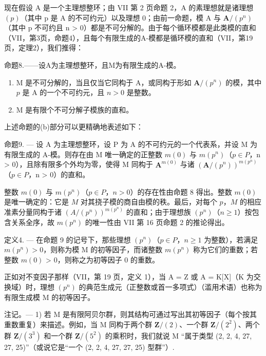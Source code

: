 现在假设 A 是一个主理想整环；由 VII 第 2 页命题 2，A 的素理想就是诸理想 \((p)\)（其中 p 是 A 的不可约元）以及理想 0；由前一命题，模 A 与 \(\mathbf{A}/(p^{n})\)（其中 p 不可约且 n \textgreater{} 0）都是不可分解的。由于每个循环模都是此类模的直和（VII，第3页，命题4），且每个有限生成的A-模都是循环模的直和（VII，第19页，定理2），我们推得：

命题8.——设A为主理想整环，且M为有限生成的A-模。

\begin{enumerate}
\def\labelenumi{\alph{enumi})}
\item
  M 是不可分解的，当且仅当它同构于 A，或同构于形如 \(\mathbf{A} / (p^n)\) 的模，其中 \(p\) 是 A 的一个不可约元，且 \(n > 0\) 是整数。
\item
  M 是有限个不可分解子模族的直和。
\end{enumerate}

上述命题的(b)部分可以更精确地表述如下：

命题9. --- 设 A 为主理想整环，设 P 为 A 的不可约元的一个代表系，并设 M 为有限生成的 A-模。则存在由 M 唯一确定的正整数 \(m(0)\) 与 \(m(p^{n})\)（\(p \in P\)，n \textgreater{} 0），且除有限多个外均为零，使得 M 同构于 \(\mathbf{A}^{m(0)}\) 与诸 \((\mathbf{A}/(p^{n}))^{m(p^{n})}\)（\(p \in P\)，n \textgreater{} 0）的直和。

整数 \(m(0)\) 与 \(m(p^n)\)（\(p \in P\)，\(n > 0\)）的存在性由命题 8 得出。整数 \(m(0)\) 是唯一确定的：它是 \(M\) 对其挠子模的商自由模的秩。最后，对每个 \(p\)，\(M\) 的相应准素分量同构于诸 \((A/(p^n))^{m(p^n)}\) 的直和；由于理想族 \((p^n)\)（\(n \geqslant 1\)）按包含关系全序，故 \(m(p^n)\) 的唯一性由 VII 第 16 页命题 2 的推论得出。

定义4. --- 在命题 9 的记号下，那些理想 \((p^{n})\)（\(p \in P\)，\(n \geqslant 1\) 为整数），若满足 \(m(p^{n}) > 0\)，则称为模 M 的初等因子，而诸整数 \(m(p^{n})\) 称为它们的重数；若整数 \(m(0)\) \textgreater{} 0，则称之为初等因子 0 的重数。

正如对不变因子那样（VII，第 19 页，定义 1），当 A = Z 或 A = K{[}X{]}（K 为交换域）时，理想 \((p^{n})\) 的典范生成元（正整数或首一多项式）（滥用术语）也称为有限生成模 M 的初等因子。

注记。--- 1) 若 M 是有限阿贝尔群，则其结构可通过写出其初等因子（每个按其重数重复）来描述。例如，当 M 同构于两个群 \(\mathbf{Z}/(2)\)、一个群 \(\mathbf{Z}/(2^{2})\)、两个群 \(\mathbf{Z}/(3^{3})\) 和一个群 \(\mathbf{Z}/(5^{2})\) 的乘积时，我们就说 M “属于类型 (2, 2, 4, 27, 27, 25)”（或说它是“一个 (2, 2, 4, 27, 27, 25) 型群”）.

